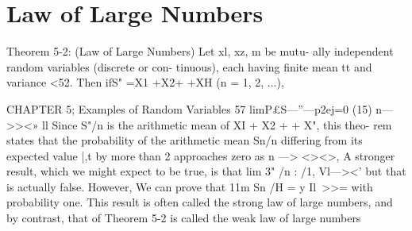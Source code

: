 \section{Law of Large Numbers}
Theorem 5-2: (Law of Large Numbers) Let xl, xz,  m be mutu-
ally independent random variables (discrete or con-
tinuous), each having ﬁnite mean tt and variance <52.
Then ifS" =X1 +X2+  +XH (n = 1, 2, ...),



CHAPTER 5; Examples of Random Variables 57
limP£S—”—p2ej=0 (15)
n—>><» ll
Since S"/n is the arithmetic mean of XI + X2 +  + X", this theo-
rem states that the probability of the arithmetic mean Sn/n differing
from its expected value |,t by more than 2 approaches zero as n —> <><>, A
stronger result, which we might expect to be true, is that lim 3" /n : /1,
Vl—>\><'
but that is actually false. However, We can prove that 11m Sn /H = y
Il~>>=
with probability one. This result is often called the strong law of large
numbers, and by contrast, that of Theorem 5-2 is called the weak law of
large numbers


